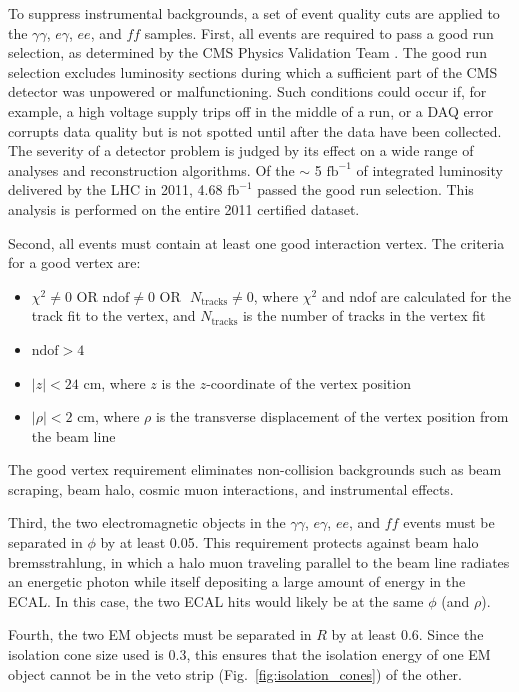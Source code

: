 \documentclass[dissertation.tex]{subfiles}
\begin{document}
To suppress instrumental backgrounds, a set of event quality cuts are applied to the $\gamma\gamma$, $e\gamma$, $ee$, and $\mathit{ff}$ samples.  First, all events are required to pass a good run selection, as determined by the CMS Physics Validation Team \cite{CMS_PVT}.  The good run selection excludes luminosity sections during which a sufficient part of the CMS detector was unpowered or malfunctioning.  Such conditions could occur if, for example, a high voltage supply trips off in the middle of a run, or a DAQ error corrupts data quality but is not spotted until after the data have been collected.  The severity of a detector problem is judged by its effect on a wide range of analyses and reconstruction algorithms.  Of the $\sim$ 5 $\mbox{fb}^{-1}$ of integrated luminosity delivered by the LHC in 2011, 4.68 $\mbox{fb}^{-1}$ passed the good run selection.  This analysis is performed on the entire 2011 certified dataset.

Second, all events must contain at least one good interaction vertex.  The criteria for a good vertex are:

\begin{itemize}
\item $\chi^{2} \neq 0\mbox{ OR}\mbox{ ndof} \neq 0\mbox{ OR}\mbox{ }N_{\mathrm{tracks}} \neq 0$, where $\chi^{2}$ and ndof are calculated for the track fit to the vertex, and $N_{\mathrm{tracks}}$ is the number of tracks in the vertex fit
\item $\mbox{ndof} > 4$
\item $|z| < 24$ cm, where $z$ is the $z$-coordinate of the vertex position
\item $|\rho| < 2$ cm, where $\rho$ is the transverse displacement of the vertex position from the beam line
\end{itemize}
%
The good vertex requirement eliminates non-collision backgrounds such as beam scraping, beam halo, cosmic muon interactions, and instrumental effects.

Third, the two electromagnetic objects in the $\gamma\gamma$, $e\gamma$, $ee$, and $\mathit{ff}$ events must be separated in $\phi$ by at least 0.05.  This requirement protects against beam halo bremsstrahlung, in which a halo muon traveling parallel to the beam line radiates an energetic photon while itself depositing a large amount of energy in the ECAL.  In this case, the two ECAL hits would likely be at the same $\phi$ (and $\rho$).

Fourth, the two EM objects must be separated in $R$ by at least 0.6.  Since the isolation cone size used is 0.3, this ensures that the isolation energy of one EM object cannot be in the veto strip (Fig.~\ref{fig:isolation_cones}) of the other.
\end{document}

